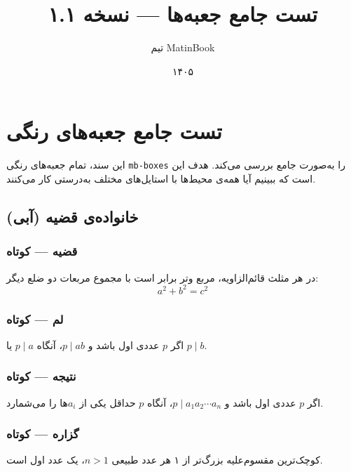 \documentclass{matinbook}
\title{تست جامع جعبه‌ها — نسخه ۱.۱}
\author{تیم MatinBook}
\date{۱۴۰۵}
\begin{document}
\maketitle

\tableofcontents

\chapter{تست جامع جعبه‌های رنگی}
\label{chap:test-boxes}

این سند، تمام جعبه‌های رنگی \texttt{mb-boxes} را به‌صورت
جامع بررسی می‌کند. هدف این است که ببینیم آیا همه‌ی محیط‌ها
با استایل‌های مختلف به‌درستی کار می‌کنند.

\section{خانواده‌ی قضیه (آبی)}
\label{sec:theorem-family}

\subsection{قضیه — کوتاه}
\begin{theorem}
    در هر مثلث قائم‌الزاویه، مربع وتر برابر است با مجموع
    مربعات دو ضلع دیگر:
    \[
    a^2 + b^2 = c^2
    \]
    \label{thm:pythagoras}
\end{theorem}

\subsection{لم — کوتاه}
\begin{lemma}[لم اقلیدس]
    اگر $p$ عددی اول باشد و $p \mid ab$، آنگاه $p \mid a$
    یا $p \mid b$.
    \label{lem:euclid}
\end{lemma}

\subsection{نتیجه — کوتاه}
\begin{corollary}
    اگر $p$ عددی اول باشد و $p \mid a_1 a_2 \cdots a_n$،
    آنگاه $p$ حداقل یکی از $a_i$ها را می‌شمارد.
    \label{cor:euclid-general}
\end{corollary}

\subsection{گزاره — کوتاه}
\begin{proposition}
    کوچک‌ترین مقسوم‌علیه بزرگ‌تر از ۱ هر عدد طبیعی $n > 1$،
    یک عدد اول است.
    \label{prop:smallest-divisor}
\end{proposition}
\end{document}
